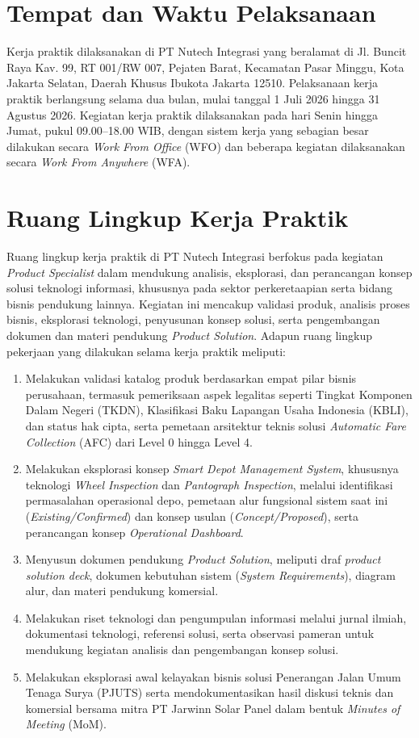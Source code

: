 \section{Tempat dan Waktu Pelaksanaan}
\label{sec:tempat_waktu}
Kerja praktik dilaksanakan di PT Nutech Integrasi yang beralamat di Jl. Buncit Raya Kav. 99, RT 001/RW 007, Pejaten Barat, Kecamatan Pasar Minggu, Kota Jakarta Selatan, Daerah Khusus Ibukota Jakarta 12510. Pelaksanaan kerja praktik berlangsung selama dua bulan, mulai tanggal 1 Juli 2026 hingga 31 Agustus 2026. Kegiatan kerja praktik dilaksanakan pada hari Senin hingga Jumat, pukul 09.00--18.00 WIB, dengan sistem kerja yang sebagian besar dilakukan secara \textit{Work From Office} (WFO) dan beberapa kegiatan dilaksanakan secara \textit{Work From Anywhere} (WFA).

\section{Ruang Lingkup Kerja Praktik}
Ruang lingkup kerja praktik di PT Nutech Integrasi berfokus pada kegiatan \textit{Product Specialist} dalam mendukung analisis, eksplorasi, dan perancangan konsep solusi teknologi informasi, khususnya pada sektor perkeretaapian serta bidang bisnis pendukung lainnya. Kegiatan ini mencakup validasi produk, analisis proses bisnis, eksplorasi teknologi, penyusunan konsep solusi, serta pengembangan dokumen dan materi pendukung \textit{Product Solution}. Adapun ruang lingkup pekerjaan yang dilakukan selama kerja praktik meliputi:

\begin{enumerate}
    \item Melakukan validasi katalog produk berdasarkan empat pilar bisnis perusahaan, termasuk pemeriksaan aspek legalitas seperti Tingkat Komponen Dalam Negeri (TKDN), Klasifikasi Baku Lapangan Usaha Indonesia (KBLI), dan status hak cipta, serta pemetaan arsitektur teknis solusi \textit{Automatic Fare Collection} (AFC) dari Level 0 hingga Level 4.
    \item Melakukan eksplorasi konsep \textit{Smart Depot Management System}, khususnya teknologi \textit{Wheel Inspection} dan \textit{Pantograph Inspection}, melalui identifikasi permasalahan operasional depo, pemetaan alur fungsional sistem saat ini (\textit{Existing/Confirmed}) dan konsep usulan (\textit{Concept/Proposed}), serta perancangan konsep \textit{Operational Dashboard}.
    \item Menyusun dokumen pendukung \textit{Product Solution}, meliputi draf \textit{product solution deck}, dokumen kebutuhan sistem (\textit{System Requirements}), diagram alur, dan materi pendukung komersial.
    \item Melakukan riset teknologi dan pengumpulan informasi melalui jurnal ilmiah, dokumentasi teknologi, referensi solusi, serta observasi pameran untuk mendukung kegiatan analisis dan pengembangan konsep solusi.
    \item Melakukan eksplorasi awal kelayakan bisnis solusi Penerangan Jalan Umum Tenaga Surya (PJUTS) serta mendokumentasikan hasil diskusi teknis dan komersial bersama mitra PT Jarwinn Solar Panel dalam bentuk \textit{Minutes of Meeting} (MoM).
\end{enumerate}

